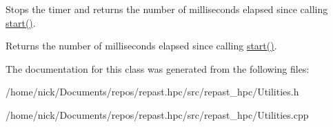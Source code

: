 Stops the timer and returns the number of milliseconds elapsed since calling \hyperlink{classrepast_1_1_timer_a6188a8aa6cc2ca98342fc0c37706f454}{start()}. 

\begin{DoxyReturn}{Returns}
the number of milliseconds elapsed since calling \hyperlink{classrepast_1_1_timer_a6188a8aa6cc2ca98342fc0c37706f454}{start()}. 
\end{DoxyReturn}


The documentation for this class was generated from the following files\-:\begin{DoxyCompactItemize}
\item 
/home/nick/\-Documents/repos/repast.\-hpc/src/repast\-\_\-hpc/Utilities.\-h\item 
/home/nick/\-Documents/repos/repast.\-hpc/src/repast\-\_\-hpc/Utilities.\-cpp\end{DoxyCompactItemize}
